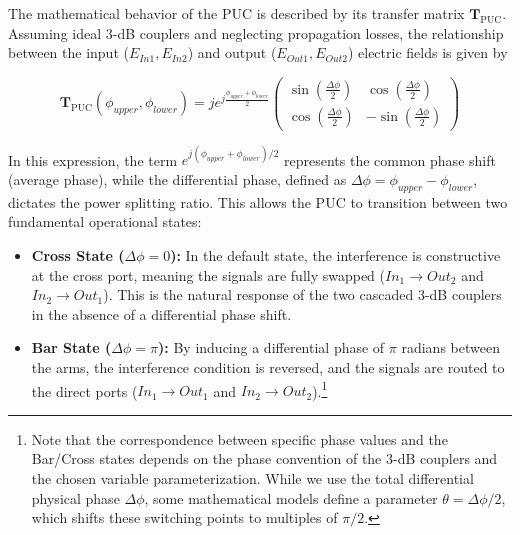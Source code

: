 The mathematical behavior of the PUC is described by its transfer matrix $\mathbf{T}_{\text{PUC}}$. 
Assuming ideal $3$-dB couplers and neglecting propagation losses, the relationship between the 
input ($E_{In1}, E_{In2}$) and output ($E_{Out1}, E_{Out2}$) electric fields is given by

\begin{equation}
\mathbf{T}_{\text{PUC}}(\phi_{upper}, \phi_{lower}) = 
j e^{j\frac{\phi_{upper} + \phi_{lower}}{2}} 
\begin{pmatrix} 
\sin\left(\frac{\Delta\phi}{2}\right) & \cos\left(\frac{\Delta\phi}{2}\right) \\[10pt] 
\cos\left(\frac{\Delta\phi}{2}\right) & -\sin\left(\frac{\Delta\phi}{2}\right) 
\end{pmatrix}
\label{eq:mzi_symmetric_matrix_phi}
\end{equation}

In this expression, the term $e^{j(\phi_{upper} + \phi_{lower})/2}$ represents the common phase 
shift (average phase), while the differential phase, defined as 
$\Delta\phi = \phi_{upper} - \phi_{lower}$, dictates the power splitting ratio. This allows the PUC 
to transition between two fundamental operational states:

\begin{itemize}
    \item \textbf{Cross State ($\Delta\phi = 0$):} In the default state, the interference is 
    constructive at the cross port, meaning the signals are fully swapped ($In_1 \rightarrow Out_2$ 
    and $In_2 \rightarrow Out_1$). This is the natural response of the two cascaded $3$-dB couplers 
    in the absence of a differential phase shift.
    \item \textbf{Bar State ($\Delta\phi = \pi$):} By inducing a differential phase of $\pi$ 
    radians between the arms, the interference condition is reversed, and the signals are routed to 
    the direct ports ($In_1 \rightarrow Out_1$ and $In_2 \rightarrow Out_2$).\footnote{Note that the 
    correspondence between specific phase values and the Bar/Cross states depends on the phase 
    convention of the $3$-dB couplers and the chosen variable parameterization. While we use the 
    total differential physical phase $\Delta\phi$, some mathematical models 
    \cite{capmanyProgrammableIntegratedPhotonics2020} define a parameter $\theta = \Delta\phi/2$, 
    which shifts these switching points to multiples of $\pi/2$.}
\end{itemize}


